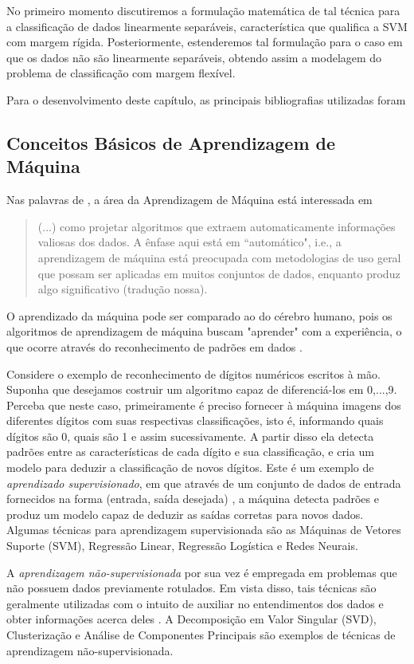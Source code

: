 \documentclass[12pt,a4paper]{scrartcl}
\theoremstyle{definition}%
\begin{document}
No primeiro momento discutiremos a formulação matemática de tal técnica para a classificação de dados linearmente separáveis, característica que qualifica a SVM com margem rígida. Posteriormente, estenderemos tal formulação para o caso em que os dados não são linearmente separáveis, obtendo assim a modelagem do problema de classificação com margem flexível.

Para o desenvolvimento deste capítulo, as principais bibliografias utilizadas foram \textcite{Faisal2019,Evelin2017}


\subsection{Conceitos Básicos de Aprendizagem de Máquina}

Nas palavras de \textcite[p. 11]{Faisal2019}, a área da Aprendizagem de Máquina está interessada em 
\begin{quote}
(...) como projetar algoritmos que extraem automaticamente informações valiosas dos dados. A ênfase aqui está em ``automático", i.e., a aprendizagem de máquina está preocupada com metodologias de uso geral que possam ser aplicadas em muitos conjuntos de dados, enquanto produz algo significativo (tradução nossa). 
\end{quote}
O aprendizado da máquina pode ser comparado ao do cérebro humano, pois os algoritmos de aprendizagem de máquina buscam "aprender" com a experiência, o que ocorre através do reconhecimento de padrões em dados \cite{Evelin2017}. 

Considere o exemplo de reconhecimento de dígitos numéricos escritos à mão. Suponha que desejamos costruir um algoritmo capaz de diferenciá-los em 0,...,9. Perceba que neste caso, primeiramente é preciso fornecer à máquina imagens dos diferentes dígitos com suas respectivas classificações, isto é, informando quais dígitos são 0, quais são 1 e assim sucessivamente. A partir disso ela detecta padrões entre as características de cada dígito e sua classificação, e cria um modelo para deduzir a classificação de novos dígitos. Este é um exemplo de \emph{aprendizado supervisionado}, em que através de um conjunto de dados de entrada fornecidos na forma (entrada, saída desejada) \cite{Lorena&Carvalho}, a máquina detecta padrões e produz um modelo capaz de deduzir as saídas corretas para novos dados. Algumas técnicas para aprendizagem supervisionada são as Máquinas de Vetores Suporte (SVM), Regressão Linear, Regressão Logística e Redes Neurais.

A \emph{aprendizagem não-supervisionada} por sua vez é empregada em problemas que não possuem dados previamente rotulados. Em vista disso, tais técnicas são geralmente utilizadas com o intuito de auxiliar no entendimentos dos dados e obter informações acerca deles \cite{Lorena&Carvalho}. A Decomposição em Valor Singular (SVD), Clusterização e Análise de Componentes Principais \cite{Evelin2017} são exemplos de técnicas de aprendizagem não-supervisionada. 
\end{document}
